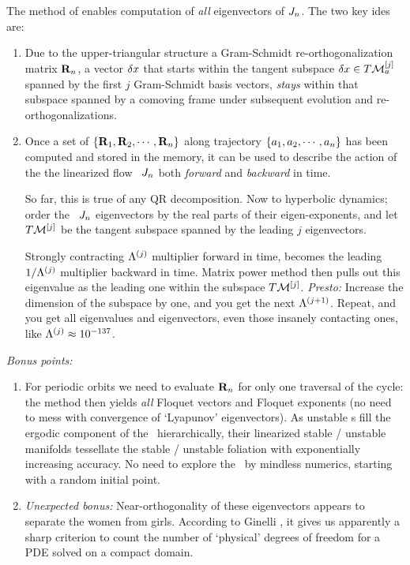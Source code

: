 The method of  enables computation of
{\em all} eigenvectors of $J_n$. The two key ides are:
\begin{enumerate}
  \item
Due to the upper-triangular structure a Gram-Schmidt
re-orthogonalization matrix ${\bf R}_n$, a vector ${\delta x}$
that starts within the tangent subspace ${\delta x} \in
T{\cal M}_{a}^{[j]}$ spanned by the first $j$ Gram-Schmidt basis
vectors, {\em stays} within that subspace spanned by a comoving
frame under subsequent evolution and re-orthogonalizations.
\item Once a set of $\{{\bf R}_1,{\bf R}_2,\cdots,{\bf R}_n\}$
along trajectory $\{a_1,a_2,\cdots,a_n\}$ has been
computed and stored in the memory, it can be used to describe
the action of the the linearized flow \jacobianM\ $J_n$
both \emph{forward} and \emph{backward} in time.

So far, this is true of any QR decomposition. Now to
hyperbolic dynamics; order the \jacobianM\ $J_n$
eigenvectors \jEigvec[\ell] by the real parts of their
eigen-exponents, and let $T{\cal M}^{[j]}$ be the tangent
subspace spanned by the leading $j$ eigenvectors.

Strongly contracting $\Lambda^{(j)}$ multiplier forward in
time, becomes the leading $1/\Lambda^{(j)}$ multiplier
backward in time. Matrix power method then pulls out this
eigenvalue as the leading one within the subspace
$T{\cal M}^{[j]}$. \emph{Presto:} Increase the dimension of the
subspace by one, and you get the next $\Lambda^{(j+1)}$.
Repeat, and you get all eigenvalues and eigenvectors, even
those insanely contacting ones, like $\Lambda^{(j)}
\approx 10^{-137}$.

\end{enumerate}
\emph{Bonus points:}
\begin{enumerate}
  \item For periodic orbits we need to evaluate ${\bf R}_n$ for
  only one traversal of the cycle: the method then yields {\em
  all} Floquet vectors and Floquet exponents (no need to mess
  with convergence of `Lyapunov' eigenvectors). As unstable \po
  s fill the ergodic component of the \statesp\ hierarchically,
  their linearized stable / unstable manifolds tessellate the
  stable / unstable foliation with exponentially increasing
  accuracy. No need to explore the \statesp\ by mindless
  numerics, starting with a random initial point. 

  \item \emph{Unexpected bonus:} Near-orthogonality of
      these eigenvectors appears to separate the women from
      girls. According to Ginelli
      \etal{}, it gives us apparently a
      sharp criterion to count the number of `physical'
      degrees of freedom for a PDE solved on a compact
      domain.
\end{enumerate}

